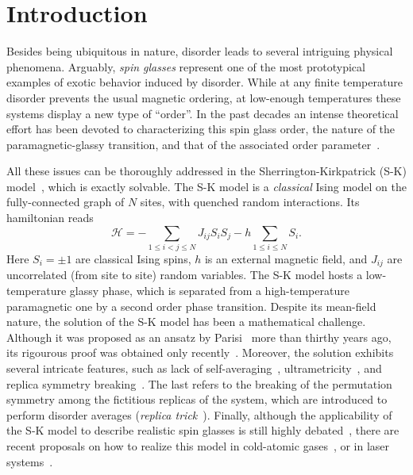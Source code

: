 \documentclass[twocolumn,superscriptaddress,prb,10pt]{revtex4-1}
\begin{document}

\maketitle


\section{Introduction}


Besides being ubiquitous in nature, disorder leads to several intriguing 
physical phenomena. 
Arguably, \emph{spin glasses} represent one of the most prototypical examples
of exotic behavior induced by disorder.
While at any finite temperature disorder prevents the 
usual magnetic ordering, at low-enough temperatures these systems display a 
new type of ``order''. In the past decades an intense theoretical 
effort has been devoted to characterizing this spin glass order, the nature of 
the paramagnetic-glassy transition, and that of the associated order 
parameter~\cite{binder-1986,parisi-book,young-1998,nishimori-book,castellani-2005}. 

All these issues can be thoroughly addressed in the Sherrington-Kirkpatrick 
(S-K) model~\cite{sherrington-1978,sherrington-1978-prl}, which is exactly 
solvable. The S-K model is a \emph{classical} Ising model on the fully-connected 
graph of $N$ sites, with quenched random interactions. Its hamiltonian reads  
%
\begin{equation}
{\mathcal H}=-\sum\limits_{1\le i<j\le N}J_{ij}S_i S_j-
h\sum\limits_{1\le i\le N}S_i.
\label{SK-intro}
\end{equation}
%
Here $S_i=\pm 1$ are classical Ising spins, $h$ is an external magnetic field, and 
$J_{ij}$ are uncorrelated (from site to site) random variables. The S-K model hosts 
a low-temperature glassy phase, which is separated from a high-temperature paramagnetic 
one by a second order phase transition. Despite its mean-field nature, the solution 
of the S-K model has been a mathematical challenge. Although it was proposed as an 
ansatz by Parisi~\cite{parisi-1980} more than thirthy years ago, its rigourous proof 
was obtained only recently~\cite{talagrand-2006}. Moreover, the solution exhibits several 
intricate features, such as lack of self-averaging~\cite{pastur-1991}, ultrametricity~\cite{
mezard-1984,rammal-1986}, and replica symmetry breaking~\cite{parisi-book,castellani-2005}. 
The last refers to the breaking of the permutation symmetry among the fictitious replicas 
of the system, which are introduced to perform disorder averages (\emph{replica 
trick}~\cite{cardy-book}). Finally, although the applicability of the S-K 
model to describe realistic spin glasses is still highly debated~\cite{yucesoy-2012,
billoire-2012,yucesoy-2013}, there are recent proposals on how to realize this model 
in cold-atomic gases~\cite{morrison-2008,rotondo-2015}, or in laser systems~\cite{
ghofraniha-2015}. 
\end{document}

